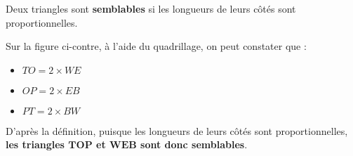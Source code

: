 \begin{definition}
    Deux triangles sont \textbf{semblables} si les longueurs de leurs côtés sont proportionnelles.
\end{definition}
\begin{exemple*1}

    \begin{minipage}{0.55\linewidth}        
    \end{minipage}
    \hfill
    \begin{minipage}{0.45\linewidth}
        Sur la figure ci-contre, à l'aide du quadrillage, on peut constater que :
        \begin{itemize}
            \item $TO =2\times WE$
            \item $OP =2\times EB$
            \item $PT =2\times BW$
        \end{itemize}
        D'après la définition, puisque les longueurs de leurs côtés sont proportionnelles, \textbf{les triangles $\mathbf{TOP}$ et $\mathbf{WEB}$ sont donc semblables}.
    \end{minipage}
\end{exemple*1}

